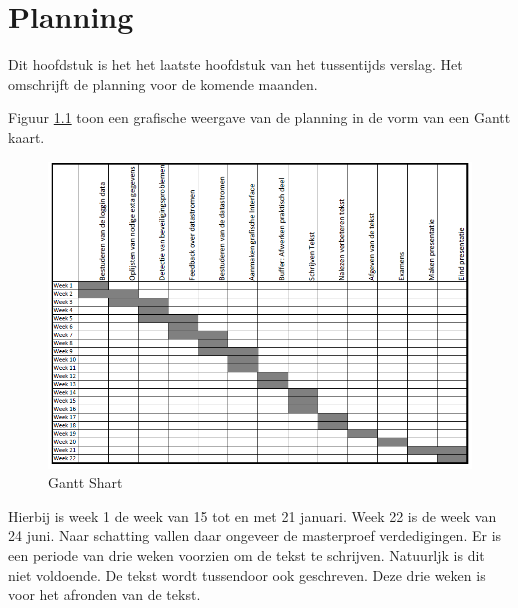 \chapter{Planning}
\label{Planning}
Dit hoofdstuk is het het laatste hoofdstuk van het tussentijds verslag. Het omschrijft de planning voor de komende maanden. 

Figuur \ref{imgGant} toon een grafische weergave van de planning in de vorm van een Gantt kaart. 

\begin{figure}[hpb]
	\includegraphics[scale=0.85]{Gantt.png}
	\centering
	\caption{Gantt Shart}
	\label{imgGant}
\end{figure} 

Hierbij is week 1 de week van 15 tot en met 21 januari. Week 22 is de week van 24 juni. Naar schatting vallen daar ongeveer de masterproef verdedigingen. 
Er is een periode van drie weken voorzien om de tekst te schrijven. Natuurljk is dit niet voldoende. De tekst wordt tussendoor ook geschreven. Deze drie weken is voor het afronden van de tekst. 
